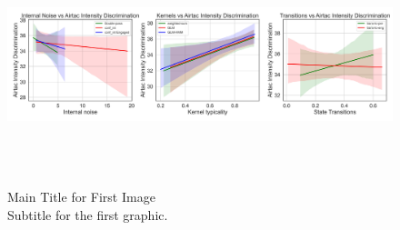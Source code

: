 \begin{figure}[H]
    \centering
    \includegraphics[width=17cm,height=7cm]{MainLayout/Images/chapter8/regression_results_airtac_int_discr.jpg}
    \caption{Main Title for First Image \\ \small Subtitle for the first graphic.}
    \label{fig:regression_results_airtac_int_discr}
\end{figure}
